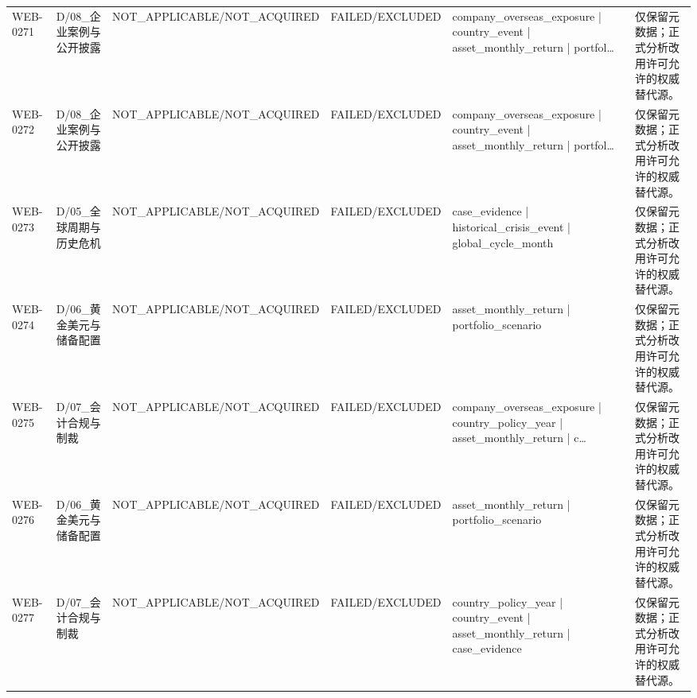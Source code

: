 \begin{landscape}
\begin{longtable}{p{1.8cm}p{2.6cm}p{2.6cm}p{2.6cm}p{4.8cm}p{7.2cm}}
WEB-0271 & D/\allowbreak{}08\_\allowbreak{}企业案例与公开披露 & NOT\_\allowbreak{}APPLICABLE/\allowbreak{}NOT\_\allowbreak{}ACQUIRED & FAILED/\allowbreak{}EXCLUDED & company\_\allowbreak{}overseas\_\allowbreak{}exposure | country\_\allowbreak{}event | asset\_\allowbreak{}monthly\_\allowbreak{}return | portfol… & 仅保留元数据；正式分析改用许可允许的权威替代源。\\
WEB-0272 & D/\allowbreak{}08\_\allowbreak{}企业案例与公开披露 & NOT\_\allowbreak{}APPLICABLE/\allowbreak{}NOT\_\allowbreak{}ACQUIRED & FAILED/\allowbreak{}EXCLUDED & company\_\allowbreak{}overseas\_\allowbreak{}exposure | country\_\allowbreak{}event | asset\_\allowbreak{}monthly\_\allowbreak{}return | portfol… & 仅保留元数据；正式分析改用许可允许的权威替代源。\\
WEB-0273 & D/\allowbreak{}05\_\allowbreak{}全球周期与历史危机 & NOT\_\allowbreak{}APPLICABLE/\allowbreak{}NOT\_\allowbreak{}ACQUIRED & FAILED/\allowbreak{}EXCLUDED & case\_\allowbreak{}evidence | historical\_\allowbreak{}crisis\_\allowbreak{}event | global\_\allowbreak{}cycle\_\allowbreak{}month & 仅保留元数据；正式分析改用许可允许的权威替代源。\\
WEB-0274 & D/\allowbreak{}06\_\allowbreak{}黄金美元与储备配置 & NOT\_\allowbreak{}APPLICABLE/\allowbreak{}NOT\_\allowbreak{}ACQUIRED & FAILED/\allowbreak{}EXCLUDED & asset\_\allowbreak{}monthly\_\allowbreak{}return | portfolio\_\allowbreak{}scenario & 仅保留元数据；正式分析改用许可允许的权威替代源。\\
WEB-0275 & D/\allowbreak{}07\_\allowbreak{}会计合规与制裁 & NOT\_\allowbreak{}APPLICABLE/\allowbreak{}NOT\_\allowbreak{}ACQUIRED & FAILED/\allowbreak{}EXCLUDED & company\_\allowbreak{}overseas\_\allowbreak{}exposure | country\_\allowbreak{}policy\_\allowbreak{}year | asset\_\allowbreak{}monthly\_\allowbreak{}return | c… & 仅保留元数据；正式分析改用许可允许的权威替代源。\\
WEB-0276 & D/\allowbreak{}06\_\allowbreak{}黄金美元与储备配置 & NOT\_\allowbreak{}APPLICABLE/\allowbreak{}NOT\_\allowbreak{}ACQUIRED & FAILED/\allowbreak{}EXCLUDED & asset\_\allowbreak{}monthly\_\allowbreak{}return | portfolio\_\allowbreak{}scenario & 仅保留元数据；正式分析改用许可允许的权威替代源。\\
WEB-0277 & D/\allowbreak{}07\_\allowbreak{}会计合规与制裁 & NOT\_\allowbreak{}APPLICABLE/\allowbreak{}NOT\_\allowbreak{}ACQUIRED & FAILED/\allowbreak{}EXCLUDED & country\_\allowbreak{}policy\_\allowbreak{}year | country\_\allowbreak{}event | asset\_\allowbreak{}monthly\_\allowbreak{}return | case\_\allowbreak{}evidence & 仅保留元数据；正式分析改用许可允许的权威替代源。\\

\end{longtable}
\end{landscape}
